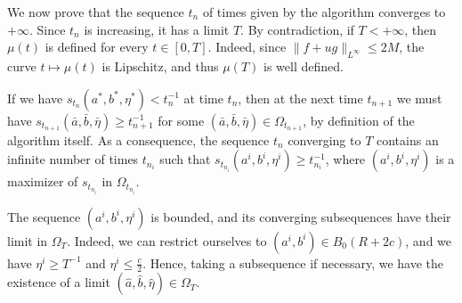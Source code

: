 \documentclass{article}
\theoremstyle{definition}\newtheorem{remark}{Remark}
\begin{document}
\medskip

 We now prove that the sequence $t_n$ of times given by the algorithm converges to $+\infty$. Since $t_n$ is increasing, it has a limit $T$. By contradiction, if $T<+\infty$, then $\mu(t)$ is defined for every $t\in[0,T]$. Indeed, since $\|f+ug\|_{L^\infty}\leq 2M$, the curve $t\mapsto\mu(t)$ is Lipschitz, and thus $\mu(T)$ is well defined.

If we have $s_{t_n}(a^*,b^*,\eta^*)<t_n^{-1}$ at time $t_n$, then at the next time $t_{n+1}$ we must have $s_{t_{n+1}}(\bar a, \bar b,\bar \eta)\geq t_{n+1}^{-1}$ for some $(\bar a, \bar b,\bar \eta)\in\Omega_{t_{n+1}}$, by definition of the algorithm itself. As a consequence, the sequence $t_n$ converging to $T$ contains an infinite number of times $t_{n_i}$ such that $s_{t_{n_i}}(a^i,b^i,\eta^i)\geq t_{n_i}^{-1}$, where $(a^i,b^i,\eta^i)$ is a maximizer of $s_{t_{n_i}}$ in $\Omega_{t_{n_i}}$.

The sequence $(a^i,b^i,\eta^i)$ is bounded, and its converging subsequences have their limit in $\Omega_T$. Indeed, we can restrict ourselves to $(a^i,b^i)\in B_0(R+2c)$, and we have $\eta^i\geq T^{-1}$ and $\eta^i\leq \frac{c}2$. Hence, taking a subsequence if necessary, we have the existence of a limit $(\hat a, \hat b,\hat \eta)\in\Omega_T$.
\end{document}
